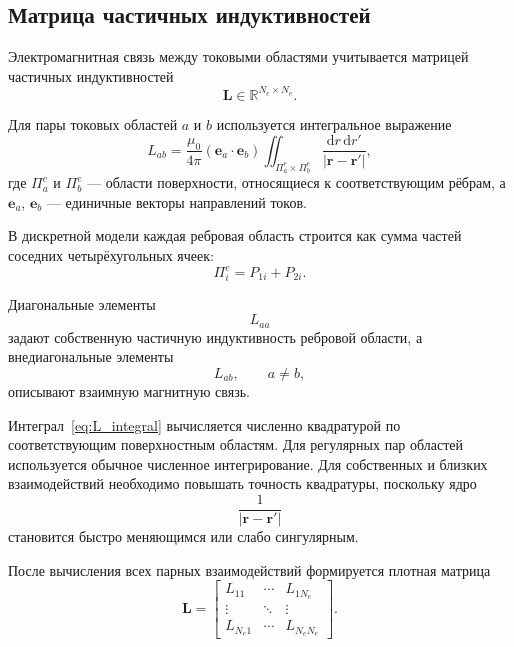 \documentclass[12pt,a4paper]{article}
\newcommand{\vect}[1]{\boldsymbol{#1}}
\newcommand{\matr}[1]{\mathbf{#1}}
\begin{document}
\subsection{Матрица частичных индуктивностей}

Электромагнитная связь между токовыми областями учитывается
матрицей частичных индуктивностей
\begin{equation}
    \matr L\in\mathbb R^{N_e\times N_e}.
\end{equation}

Для пары токовых областей $a$ и $b$ используется интегральное выражение
\begin{equation}
    L_{ab}
    =
    \frac{\mu_0}{4\pi}
    \left(
        \vect e_a\cdot\vect e_b
    \right)
    \iint_{\Pi_a^e\times\Pi_b^e}
    \frac{
        \mathrm d r\,\mathrm d r'
    }{
        |\vect r-\vect r'|
    },
    \label{eq:L_integral}
\end{equation}
где $\Pi_a^e$ и $\Pi_b^e$ --- области поверхности, относящиеся
к соответствующим рёбрам, а $\vect e_a$, $\vect e_b$ --- единичные
векторы направлений токов.

В дискретной модели каждая ребровая область строится как сумма частей
соседних четырёхугольных ячеек:
\begin{equation}
    \Pi_i^e
    =
    P_{1i}+P_{2i}.
\end{equation}

Диагональные элементы
\begin{equation}
    L_{aa}
\end{equation}
задают собственную частичную индуктивность ребровой области,
а внедиагональные элементы
\begin{equation}
    L_{ab},\qquad a\neq b,
\end{equation}
описывают взаимную магнитную связь.

Интеграл~\eqref{eq:L_integral} вычисляется численно квадратурой
по соответствующим поверхностным областям. Для регулярных пар областей
используется обычное численное интегрирование. Для собственных и близких
взаимодействий необходимо повышать точность квадратуры, поскольку ядро
\begin{equation}
    \frac{1}{|\vect r-\vect r'|}
\end{equation}
становится быстро меняющимся или слабо сингулярным.

После вычисления всех парных взаимодействий формируется плотная матрица
\begin{equation}
    \matr L=
    \begin{bmatrix}
        L_{11} & \cdots & L_{1N_e}\\
        \vdots & \ddots & \vdots\\
        L_{N_e1} & \cdots & L_{N_eN_e}
    \end{bmatrix}.
\end{equation}
\end{document}
